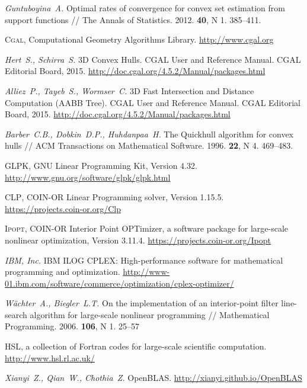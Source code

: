 \documentclass[a4paper, 10pt]{article}
\theoremstyle{definition}
\theoremstyle{plain}
\theoremstyle{plain}
\begin{document}
\begin{thebibliography}{50}
\emph{Guntuboyina~A.}
Optimal rates of convergence for convex set estimation from support functions //
The Annals of Statistics.
2012.
\textbf{40},
N 1.
385--411.

\textsc{Cgal}, {C}omputational {G}eometry {A}lgorithms {L}ibrary.
\url{http://www.cgal.org}

\emph{Hert~S., Schirra~S.}
{3D} Convex Hulls.
{CGAL} User and Reference Manual.
{CGAL Editorial Board},
2015.
\url{http://doc.cgal.org/4.5.2/Manual/packages.html}

\emph{Alliez~P., Tayeb~S., Wormser~C.}
{3D} Fast Intersection and Distance Computation ({AABB} Tree).
{CGAL} User and Reference Manual.
{CGAL Editorial Board},
2015.
\url{http://doc.cgal.org/4.5.2/Manual/packages.html}

\emph{Barber~C.B., Dobkin~D.P., Huhdanpaa~H.}
The Quickhull algorithm for convex hulls //
ACM Transactions on Mathematical Software.
1996.
\textbf{22},
N 4.
469--483.

\textsc{GLPK}, {GNU} {L}inear {P}rogramming {K}it, Version 4.32.
\url{http://www.gnu.org/software/glpk/glpk.html}

\textsc{CLP}, {COIN-OR} {L}inear {P}rogramming solver, Version 1.15.5.
\url{https://projects.coin-or.org/Clp}

\textsc{Ipopt}, {COIN-OR} {I}nterior {P}oint {OPT}imizer, a software package for
large-scale nonlinear optimization, Version 3.11.4.
\url{https://projects.coin-or.org/Ipopt}

\emph{IBM, Inc.}
{IBM ILOG CPLEX}: High-performance software for mathematical programming and
optimization.
\url{http://www-01.ibm.com/software/commerce/optimization/cplex-optimizer/}

\emph{W{\"{a}}chter~A., Biegler~L.T.}
On the implementation of an interior-point filter line-search algorithm for
large-scale nonlinear programming //
Mathematical Programming.
2006.
\textbf{106},
N 1.
25--57

{HSL}, a collection of Fortran codes for large-scale scientific computation.
\url{http://www.hsl.rl.ac.uk/}

\emph{Xianyi~Z., Qian~W., Chothia~Z.}
{OpenBLAS}.
\url{http://xianyi.github.io/OpenBLAS}

\end{thebibliography}


%
\end{document}

